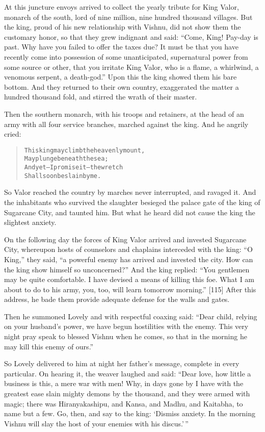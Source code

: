 \documentclass[article, twoside, 14pt]{memoir}
\renewenvironment{verbatim}{%
\begin{quote}%
\vskip -10pt%
\begin{alltt}\normalfont\large}{\end{alltt}%
\end{quote}%
\vskip -10pt
} %
\begin{document}
At this juncture envoys arrived to collect the yearly tribute for
King Valor, monarch of the south, lord of nine million, nine
hundred thousand villages. But the king, proud of his new
relationship with Vishnu, did not show them the customary honor, so
that they grew indignant and said:
``Come, King! Pay-day is past. Why have you failed to offer the taxes due? It must be that you have recently come into possession of some unanticipated, supernatural power from some source or other, that you irritate King Valor, who is a flame, a whirlwind, a venomous serpent, a death-god.''
Upon this the king showed them his bare bottom. And they returned
to their own country, exaggerated the matter a hundred thousand
fold, and stirred the wrath of their master.

Then the southern monarch, with his troops and retainers, at the
head of an army with all four service branches, marched against the
king. And he angrily cried:

\begin{verbatim}
This king may climb the heavenly mount,
    May plunge beneath the sea;
And yet--I promise it--the wretch
    Shall soon be slain by me.
\end{verbatim}
So Valor reached the country by marches never interrupted, and
ravaged it. And the inhabitants who survived the slaughter besieged
the palace gate of the king of Sugarcane City, and taunted him. But
what he heard did not cause the king the slightest anxiety.

On the following day the forces of King Valor arrived and invested
Sugarcane City, whereupon hosts of counselors and chaplains
interceded with the king: ``O King,'' they said,
``a powerful enemy has arrived and invested the city. How can the king show himself so unconcerned?''
And the king replied:
``You gentlemen may be quite comfortable. I have devised a means of killing this foe. What I am about to do to his army, you, too, will learn tomorrow morning.''
[115] After this address, he bade them provide adequate defense for
the walls and gates.

Then he summoned Lovely and with respectful coaxing said:
``Dear child, relying on your husband's power, we have begun hostilities with the enemy. This very night pray speak to blessed Vishnu when he comes, so that in the morning he may kill this enemy of ours.''

So Lovely delivered to him at night her father's message, complete
in every particular. On hearing it, the weaver laughed and said:
``Dear love, how little a business is this, a mere war with men! Why, in days gone by I have with the greatest ease slain mighty demons by the thousand, and they were armed with magic; there was Hiranyakashipu, and Kansa, and Madhu, and Kaitabha, to name but a few. Go, then, and say to the king: `Dismiss anxiety. In the morning Vishnu will slay the host of your enemies with his discus.'\,''
\end{document}
